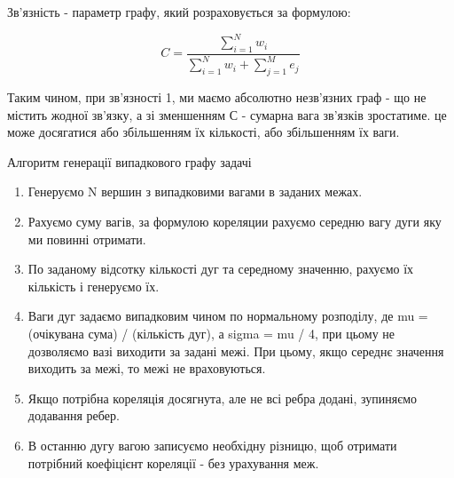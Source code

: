     Зв'язність - параметр графу, який розраховується за формулою:
    
    \[ C = \frac{\sum_{i=1}^N{w_i}}{\sum_{i=1}^N{w_i} + \sum_{j=1}^M{e_j}}\]

    Таким чином, при зв'язності 1, ми маємо абсолютно незв'язних граф - що не містить
    жодної зв'язку, а зі зменшенням С - сумарна вага зв'язків зростатиме. це
    може досягатися або збільшенням їх кількості, або збільшенням їх ваги.

Алгоритм генерації випадкового графу задачі

\begin{enumerate}
    \item Генеруємо N вершин з випадковими вагами в заданих межах.
    \item Рахуємо суму вагів, за формулою кореляции рахуємо середню вагу дуги яку ми повинні отримати.
    \item По заданому відсотку кількості дуг та середному значенню, рахуємо їх кількість і генеруємо їх.
    \item Ваги дуг задаємо випадковим чином по нормальному розподілу, де mu = (очікувана сума) / (кількість дуг), а sigma = mu / 4, при цьому не дозволяємо вазі виходити за задані межі. При цьому, якщо середнє значення виходить за межі, то межі не враховуються.
    \item Якщо потрібна кореляція досягнута, але не всі ребра додані, зупиняємо додавання ребер.
    \item В останню дугу вагою записуємо необхідну різницю, щоб отримати потрібний коефіцієнт кореляції - без урахування меж.
\end{enumerate}
